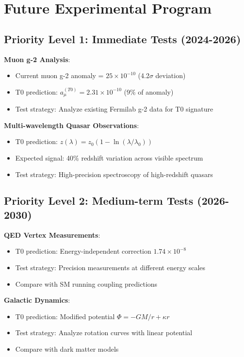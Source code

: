 \documentclass[12pt,a4paper]{article}
\begin{document}
	\section{Future Experimental Program}
	
	\subsection{Priority Level 1: Immediate Tests (2024-2026)}
	
	\textbf{Muon g-2 Analysis}:
	\begin{itemize}
		\item Current muon g-2 anomaly = $25 \times 10^{-10}$ (4.2$\sigma$ deviation)
		\item T0 prediction: $a_{\mu}^{(T0)} = 2.31 \times 10^{-10}$ (9\% of anomaly)
		\item Test strategy: Analyze existing Fermilab g-2 data for T0 signature
	\end{itemize}
	
	\textbf{Multi-wavelength Quasar Observations}:
	\begin{itemize}
		\item T0 prediction: $z(\lambda) = z_0(1 - \ln(\lambda/\lambda_0))$
		\item Expected signal: 40\% redshift variation across visible spectrum
		\item Test strategy: High-precision spectroscopy of high-redshift quasars
	\end{itemize}
	
	\subsection{Priority Level 2: Medium-term Tests (2026-2030)}
	
	\textbf{QED Vertex Measurements}:
	\begin{itemize}
		\item T0 prediction: Energy-independent correction $1.74 \times 10^{-8}$
		\item Test strategy: Precision measurements at different energy scales
		\item Compare with SM running coupling predictions
	\end{itemize}
	
	\textbf{Galactic Dynamics}:
	\begin{itemize}
		\item T0 prediction: Modified potential $\Phi = -GM/r + \kappa r$
		\item Test strategy: Analyze rotation curves with linear potential
		\item Compare with dark matter models
	\end{itemize}
	
\end{document}
